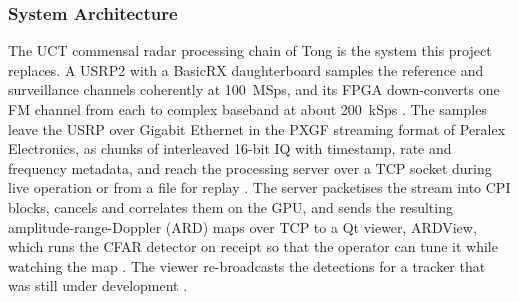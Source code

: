 \subsubsection{System Architecture}
\label{subsubsec:ch2.implementations.uct.architecture}
\todo{}
The UCT commensal radar processing chain of Tong \citep{tong2014} is the system this project replaces. A USRP2 with a BasicRX daughterboard samples the reference and surveillance channels coherently at 100~MSps, and its FPGA down-converts one FM channel from each to complex baseband at about 200~kSps \citep{tong2015}. The samples leave the USRP over Gigabit Ethernet in the PXGF streaming format of Peralex Electronics, as chunks of interleaved 16-bit IQ with timestamp, rate and frequency metadata, and reach the processing server over a TCP socket during live operation or from a file for replay \citep{tong2014}. The server packetises the stream into CPI blocks, cancels and correlates them on the GPU, and sends the resulting amplitude-range-Doppler (ARD) maps over TCP to a Qt viewer, ARDView, which runs the CFAR detector on receipt so that the operator can tune it while watching the map \citep{tong2014}. The viewer re-broadcasts the detections for a tracker that was still under development \citep{tong2014}.

